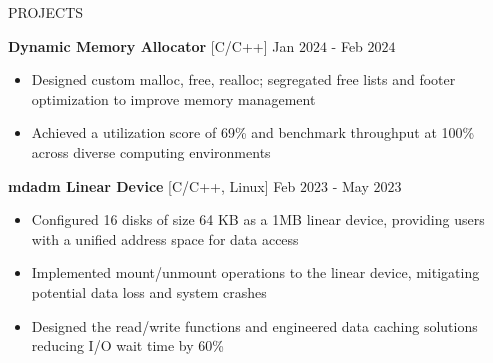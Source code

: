 \documentclass{resume} %
\begin{document}
\begin{rSection}{PROJECTS}

{\bf Dynamic Memory Allocator }{[C/C++] } \hfill Jan $2024$ - Feb $2024$
\begin{itemize}[itemsep = -4pt]
    \item Designed custom malloc, free, realloc; segregated free lists and footer optimization to improve memory management
    \item Achieved a utilization score of 69\% and benchmark throughput at 100\% across diverse computing environments
\end{itemize}


{\bf mdadm Linear Device }{[C/C++, Linux] } \hfill Feb $2023$ - May $2023$
\begin{itemize}[itemsep = -4pt]
    \item Configured 16 disks of size 64 KB as a 1MB linear device, providing users with a unified address space for data access
    \item Implemented mount/unmount operations to the linear device, mitigating potential data loss and system crashes
    \item Designed the read/write functions and engineered data caching solutions reducing I/O wait time by 60\%
\end{itemize}

\end{rSection}
\end{document}
